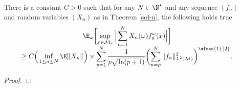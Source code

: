 \begin{prop}\label{mapi2}
There is a constant $C>0$ such that for any $N\in \N^\star$ and any sequence $(f_n)$ and random variables $(X_n)$ as in Theorem \ref{sol-u}, the following holds true\vspace*{-.5\baselineskip}
\begin{multline*}
\E_{\omega}\biggl[\sup_{x\in \mathcal{M}_s}\Big| \sum_{n=1}^N X_n(\omega) f_n^{\omega}(x) \Big| \biggr]\\[-5pt]
\geq C\Big(\inf_{1\leq n\leq N} \E[|X_n|]\Big)\times \sum_{p=1}^N \frac{1}{p\sqrt{\ln(p+1)}}\biggl(\sum_{n=p}^{N} \|f_n\|_{L^2(\mathcal{M})}^2 \biggr)^{\sfrac{1}{2}}.
\end{multline*}
\end{prop}
\begin{proof}


\end{proof}
